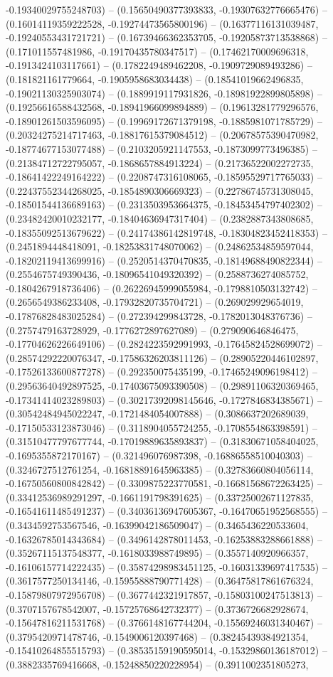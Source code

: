 -0.19340029755248703) -- (0.15650490377393833, -0.19307632776665476) -- (0.16014119359222528, -0.19274473565800196) -- (0.16377116131039487, -0.19240553431721721) -- (0.16739466362353705, -0.19205873713538868) -- (0.171011557481986, -0.19170435780347517) -- (0.17462170009696318, -0.1913424103117661) -- (0.1782249489462208, -0.1909729089493286) -- (0.181821161779664, -0.1905958683034438) -- (0.18541019662496835, -0.19021130325903074) -- (0.1889919117931826, -0.18981922899805898) -- (0.19256616588432568, -0.18941966099894889) -- (0.19613281779296576, -0.18901261503596095) -- (0.19969172671379198, -0.1885981071785729) -- (0.20324275214717463, -0.18817615379084512) -- (0.20678575390470982, -0.18774677153077488) -- (0.2103205921147553, -0.1873099773496385) -- (0.21384712722795057, -0.1868657884913224) -- (0.21736522002272735, -0.18641422249164222) -- (0.2208747316108065, -0.18595529717765033) -- (0.22437552344268025, -0.1854890306669323) -- (0.22786745731308045, -0.18501544136689163) -- (0.2313503953664375, -0.18453454797402302) -- (0.23482420010232177, -0.18404636947317404) -- (0.2382887343808685, -0.18355092513679622) -- (0.24174386142819748, -0.18304823452418353) -- (0.2451894448418091, -0.18253831748070062) -- (0.24862534859597044, -0.18202119413699916) -- (0.2520514370470835, -0.18149688490822344) -- (0.2554675749390436, -0.18096541049320392) -- (0.2588736274085752, -0.1804267918736406) -- (0.26226945999055984, -0.1798810503132742) -- (0.2656549386233408, -0.17932820735704721) -- (0.269029929654019, -0.17876828483025284) -- (0.272394299843728, -0.1782013048376736) -- (0.2757479163728929, -0.1776272897627089) -- (0.279090646846475, -0.17704626226649106) -- (0.2824223592991993, -0.17645824528699072) -- (0.28574292220076347, -0.17586326203811126) -- (0.28905220446102897, -0.17526133600877278) -- (0.292350075435199, -0.17465249096198412) -- (0.29563640492897525, -0.17403675093390508) -- (0.29891106320369465, -0.17341414023289803) -- (0.30217392098145646, -0.1727846834385671) -- (0.30542484945022247, -0.1721484054007888) -- (0.3086637202689039, -0.17150533123873046) -- (0.3118904055724255, -0.1708554863398591) -- (0.31510477797677744, -0.17019889635893837) -- (0.31830671058404025, -0.1695355872170167) -- (0.321496076987398, -0.16886558510040303) -- (0.3246727512761254, -0.16818891645963385) -- (0.32783660804056114, -0.16750560800842842) -- (0.3309875223770581, -0.16681568672263425) -- (0.33412536989291297, -0.1661191798391625) -- (0.33725002671127835, -0.16541611485491237) -- (0.34036136947605367, -0.16470651952568555) -- (0.3434592753567546, -0.16399042186509047) -- (0.3465436220533604, -0.16326785014343684) -- (0.3496142878011453, -0.16253883288661888) -- (0.35267115137548377, -0.1618033988749895) -- (0.3557140920966357, -0.16106157714222435) -- (0.35874298983451125, -0.16031339697417535) -- (0.3617577250134146, -0.15955888790771428) -- (0.36475817861676324, -0.15879807972956708) -- (0.3677442321917857, -0.15803100247513813) -- (0.3707157678542007, -0.15725768642732377) -- (0.3736726682928674, -0.15647816211531768) -- (0.3766148167744204, -0.15569246031340467) -- (0.3795420971478746, -0.1549006120397468) -- (0.38245439384921354, -0.15410264855515793) -- (0.38535159190595014, -0.15329860136187012) -- (0.3882335769416668, -0.15248850220228954) -- (0.3911002351805273, 